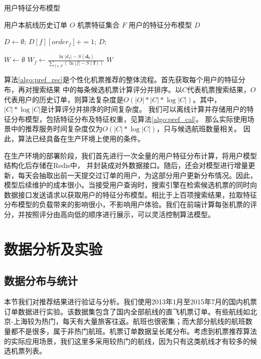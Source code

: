 \begin{algorithm}
\caption{用户特征分布模型}
\label{algo:pref_cal}
\begin{algorithmic}[1]
\Require
\Statex 用户本航线历史订单 $O$
\Statex 机票特征集合 $F$
\Ensure
\Statex 用户的特征分布模型 $D$

\State $D \gets \emptyset$;
\State $D[f][order_f] += 1$;
\EndFor	
\EndFor 
\State \Return $D$;
\EndFunction

\State $W \gets \emptyset$
\State $W_f \gets \frac{\ln |d_f| - S(\mathbf{d_f})}{\sum_{f \in F}(\ln |f| - S(\mathbf{f}))}$
\EndFor
\State \Return $W$
\EndFunction

\end{algorithmic}
\end{algorithm}


算法\ref{algo:pref_rec}是个性化机票推荐的整体流程。首先获取每个用户的特征分布，再对搜索结果
中的每条候选机票计算评分并排序。以$C$代表机票搜索结果，$O$代表用户的历史订单，则算法复杂度是$O(|O|*|C|*\log|C|)$。其中，$|C|*\log|C|$是计算评分并排序的时间复杂度。
我们可以离线计算并存储用户的特征分布模型，包括特征分布及特征权重，见算法\ref{algo:pref_cal}。
那么实际使用场景中的推荐服务时间复杂度仅为$O(|C|*\log|C|)$，只与候选航班数量相关。
因此，算法已经具备在生产环境上使用的条件。

在生产环境的部署阶段，我们首先进行一次全量的用户特征分布计算，将用户模型结构化后存储在Redis中，
并封装成对外数据接口。随后，还会对模型进行增量更新，每天会抽取出前一天提交过订单的用户，为这部分用户更新分布情况。因此，模型后续维护的成本很小。当接受用户查询时，搜索引擎在检索候选机票的同时向数据接口发送请求以获取用户的特征分布模型。相比于上百项搜索结果，拉取特征分布模型的负载带来的影响很小，不影响用户体验。我们在前端计算每张机票的评分，并按照评分由高向低的顺序进行展示，可以灵活控制算法模型。

\section{数据分析及实验}

\subsection{数据分布与统计}
本节我们对推荐结果进行验证与分析。我们使用2013年1月至2015年7月的国内机票订单数据进行实验。该数据集包含了国内全部航线的直飞机票订单。有些航线如北京-上海较为热门，每天有大量旅客往返。航班也很密集；而大部分航线的航班数量都不是很多，属于非热门航班。机票订单数据呈长尾分布。考虑到机票推荐算法的实际应用场景，我们这里多采用较热门的航线，因为只有这类航线才有较多的候选机票列表。

